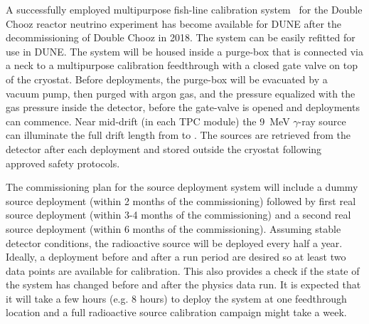 A successfully employed multipurpose fish-line calibration
system~\cite{DCnearDetTDR}  
 for the Double Chooz
reactor neutrino experiment has become available for DUNE after
the decommissioning of Double Chooz in 2018. The system can be
easily refitted for use in DUNE. The system will be housed inside
a purge-box that is connected via a neck to a multipurpose
calibration feedthrough with a closed gate valve on top of the
cryostat. Before deployments, the purge-box will be evacuated by a
vacuum pump, then purged with argon gas, and the pressure
equalized with the gas pressure inside the detector, before the
gate-valve is opened and deployments can commence. 
Near mid-drift (in each TPC module) the \SI{9}{\MeV}
$\gamma$-ray source can illuminate the full drift length from
 to . The sources are retrieved from the
detector after each deployment and stored outside the cryostat following approved safety protocols.

The commissioning plan for the source deployment system will include a dummy 
source deployment (within 2 months of the commissioning) followed by first real source deployment (within 3-4 months of the commissioning) and a second real source deployment (within 6 months of the commissioning). Assuming stable detector conditions, the radioactive source will be deployed every half a year. Ideally, a deployment before and after a run period are desired so at least two data points are available for calibration. This also provides a check if the state of the system
has changed before and after the physics data run.
It is expected that it will take a few hours (e.g. 8 hours) to deploy the system at one feedthrough location and a full radioactive source calibration campaign might take %
a week.

